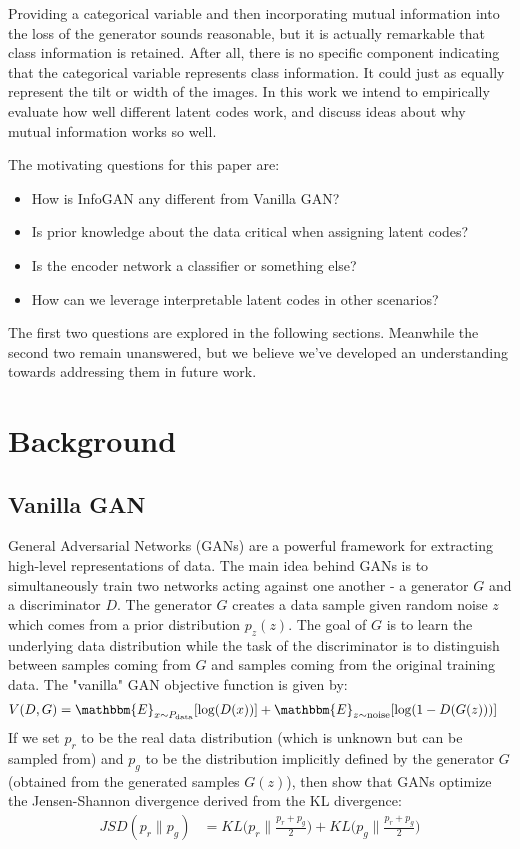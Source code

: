 \documentclass{article}
\newcommand{\e}{\mathbbm{E}}
\begin{document}
Providing a categorical variable and then incorporating mutual information into the loss of the generator sounds reasonable, but it is actually remarkable that class information is retained. After all, there is no specific component indicating that the categorical variable represents class information. It could just as equally represent the tilt or width of the images. In this work we intend to empirically evaluate how well different latent codes work, and discuss ideas about why mutual information works so well.

The motivating questions for this paper are:

\begin{itemize}
    \item How is InfoGAN any different from Vanilla GAN?
    \item Is prior knowledge about the data critical when assigning latent codes?
    \item Is the encoder network a classifier or something else?
    \item How can we leverage interpretable latent codes in other scenarios?
\end{itemize}

The first two questions are explored in the following sections. Meanwhile the second two remain unanswered, but we believe we've developed an understanding towards addressing them in future work.

\section{Background}

\subsection{Vanilla GAN}
General Adversarial Networks (GANs) \cite{goodfellow2014generative} are a powerful framework for extracting high-level representations of data. The main idea behind GANs is to simultaneously train two networks acting against one another - a generator $G$ and a discriminator $D$. The generator $G$ creates a data sample given random noise $z$ which comes from a prior distribution $p_z(z)$. The goal of $G$ is to learn the underlying data distribution while the task of the discriminator is to distinguish between samples coming from $G$ and samples coming from the original training data. The "vanilla" GAN objective function is given by:
\begin{align}\label{GANloss}
    V(D,G) & = \e_{x\sim P_{\rm{data}}}[\log(D(x)) ] + \e_{z\sim \rm{noise}} [\log (1- D(G(z)))] 
\end{align}
If we set $p_r$ to be the real data distribution (which is unknown but can be sampled from) and $p_g$ to be the distribution implicitly defined by the generator $G$ (obtained from the generated samples $G(z)$), then \cite{goodfellow2014generative} show that GANs optimize the Jensen-Shannon divergence derived from the KL divergence:
\begin{align}\label{JSD}
JSD(p_r\|p_g)& = KL\Big(p_r \Big\| \frac{p_r+p_g}{2}\Big) + KL\Big(p_g\Big\|\frac{p_r+p_g}{2}\Big)
\end{align}
\end{document}
